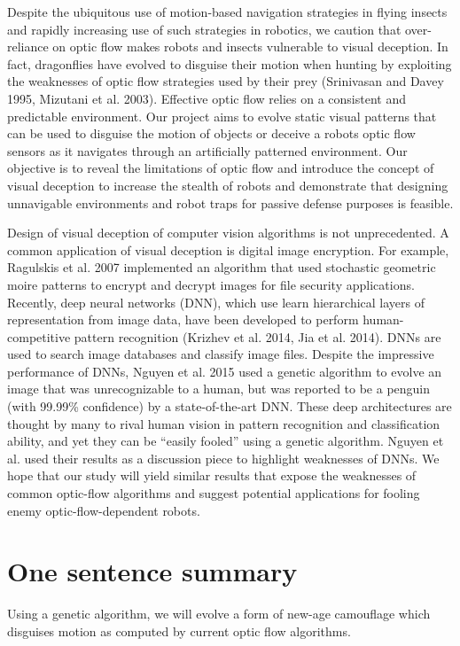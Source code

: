 \documentclass[12pt,letter]{article}
\begin{document}
Despite the ubiquitous use of motion-based navigation strategies in flying insects and rapidly increasing use of such strategies in robotics, we caution that over-reliance on optic flow makes robots and insects vulnerable to visual deception. In fact, dragonflies have evolved to disguise their motion when hunting by exploiting the weaknesses of optic flow strategies used by their prey (Srinivasan and Davey 1995, Mizutani et al. 2003). Effective optic flow relies on a consistent and predictable environment. Our project aims to evolve static visual patterns that can be used to disguise the motion of objects or deceive a robots optic flow sensors as it navigates through an artificially patterned environment. Our objective is to reveal the limitations of optic flow and introduce the concept of visual deception to increase the stealth of robots and demonstrate that designing unnavigable environments and robot traps for passive defense purposes is feasible. 

Design of visual deception of computer vision algorithms is not unprecedented. A common application of visual deception is digital image encryption. For example, Ragulskis et al. 2007 implemented an algorithm that used stochastic geometric moire patterns to encrypt and decrypt images for file security applications. Recently, deep neural networks (DNN), which use learn hierarchical layers of representation from image data, have been developed to perform human-competitive pattern recognition (Krizhev et al. 2014, Jia et al. 2014). DNNs are used to search image databases and classify image files. Despite the impressive performance of DNNs, Nguyen et al. 2015 used a genetic algorithm to evolve an image that was unrecognizable to a human, but was reported to be a penguin (with 99.99\% confidence) by a state-of-the-art DNN. These deep architectures are thought by many to rival human vision in pattern recognition and classification ability, and yet they can be “easily fooled” using a genetic algorithm. Nguyen et al. used their results as a discussion piece to highlight weaknesses of DNNs. We hope that our study will yield similar results that expose the weaknesses of common optic-flow algorithms and suggest potential applications for fooling enemy optic-flow-dependent robots.

\section{One sentence summary} 

Using a genetic algorithm, we will evolve a form of new-age camouflage which disguises motion as computed by current optic flow algorithms. 
\end{document}
